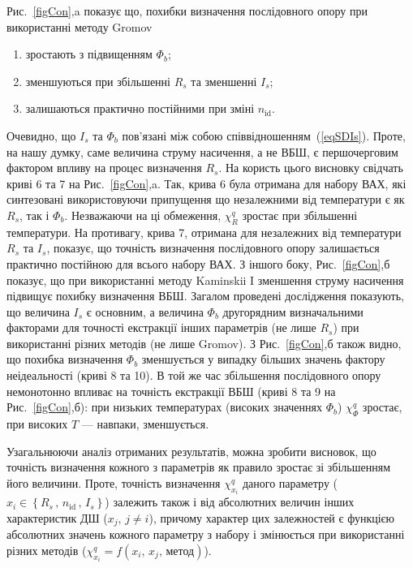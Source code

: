 Рис.~\ref{figCon},a показує що, похибки визначення послідовного опору при використанні методу Gromov
\begin{enumerate}[label=\asbuk*),leftmargin=0em,itemindent=1.5em]
\item зростають з підвищенням $\Phi_b$;
\item зменшуються при збільшенні $R_s$ та зменшенні $I_s$;
\item залишаються практично постійними при зміні $n_\mathrm{id}$.
\end{enumerate}
Очевидно, що $I_s$ та $\Phi_b$ пов'язані між собою співвідношенням~(\ref{eqSDIs}).
Проте, на нашу думку, саме величина струму насичення, а не ВБШ, є першочерговим фактором впливу на процес визначення $R_s$.
На користь цього висновку свідчать криві 6 та 7 на Рис.~\ref{figCon},a.
Так, крива 6 була отримана для набору ВАХ, які синтезовані використовуючи припущення що незалежними від температури є як $R_s$, так і $\Phi_b$.
Незважаючи на ці обмеження, $\chi^q_R$ зростає при збільшенні температури.
На противагу, крива 7, отримана для незалежних від температури $R_s$ та $I_s$, показує, що точність визначення послідовного опору залишається практично постійною для всього набору ВАХ.
З іншого боку, Рис.~\ref{figCon},б показує, що при використанні методу Kaminskii I зменшення струму насичення підвищує похибку визначення ВБШ.
Загалом проведені дослідження показують, що величина $I_s$ є основним, а величина  $\Phi_b$ другорядним визначальними факторами для точності екстракції інших параметрів (не лише $R_s$) при використанні різних методів (не лише Gromov).
З Рис.~\ref{figCon},б також видно, що похибка визначення $\Phi_b$ зменшується у випадку більших значень фактору неідеальності (криві 8 та 10).
В той же час збільшення послідовного опору немонотонно впливає на точність екстракції ВБШ (криві 8 та 9 на Рис.~\ref{figCon},б):
при низьких температурах (високих значеннях $\Phi_b$) $\chi^q_{\Phi}$ зростає, при високих $T$ --- навпаки, зменшується.

Узагальнюючи аналіз отриманих результатів, можна зробити висновок, що точність визначення кожного з параметрів як правило зростає зі збільшенням його величини.
Проте, точність визначення $\chi^q_{x_i}$ даного параметру ($x_i\in\left\{R_s\,,\,n_\mathrm{id}\,,\, I_s\right\}$) залежить також і від абсолютних величин інших характеристик ДШ ($x_j,\,j\neq i$), причому характер цих залежностей є функцією абсолютних значень кожного параметру з набору і змінюється при використанні різних методів ($\chi^q_{x_i}=f(x_i,\,x_j,\,\text{метод})$).


